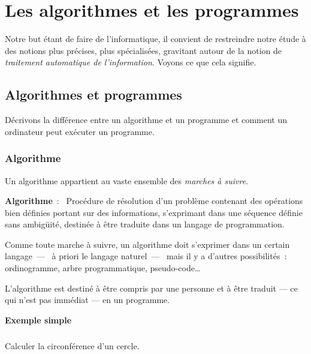 \chapter{Les algorithmes et les programmes}

	Notre but étant de faire de l’informatique, 
	il convient de restreindre notre étude 
	à des notions plus précises, plus spécialisées, 
	gravitant autour de la notion de 
	\textit{traitement automatique de l’information}.
	Voyons ce que cela signifie.

	\minitoc

	\section{Algorithmes et programmes}
	
		Décrivons la différence entre un algorithme et un programme
		et comment un ordinateur peut exécuter un programme.
	
		\subsection{Algorithme}
		
			Un algorithme appartient au vaste ensemble 
			des \textit{marches à suivre}.
	
			\textbf{Algorithme}~:~
			Procédure de résolution d’un problème 
			contenant des opérations bien définies 
			portant sur des informations, 
			s’exprimant dans une séquence définie sans ambigüité, 
			destinée à être traduite dans un langage de programmation.
		
			Comme toute marche à suivre, un algorithme doit s’exprimer dans un
			certain langage~—~ à priori le langage naturel~—~ mais il
			y a d’autres possibilités~:~ ordinogramme, arbre programmatique,
			pseudo-code…

			L'algorithme est destiné à être compris par une personne et à être
			traduit — ce qui n'est pas immédiat — en un programme. 

			\textbf{Exemple simple}

			\begin{Emphase}
				\paragraph{} Calculer la circonférence d'un cercle.
			\end{Emphase}

